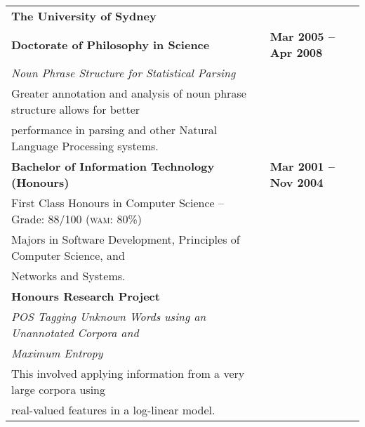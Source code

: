 \documentclass[]{article}
\begin{document}
\setlength{\tabcolsep}{0.1cm}
\begin{table*}[h!]
\begin{tabular}[h!]{p{12.7cm}l}

\textbf{The University of Sydney} & \\
\textbf{Doctorate of Philosophy in Science} & \textbf{Mar 2005 -- Apr 2008}\\
\hspace{0.5cm}\textit{Noun Phrase Structure for Statistical Parsing} & \\
\hspace{0.5cm}Greater annotation and analysis of noun phrase structure allows for better & \\
\hspace{0.5cm}performance in parsing and other Natural Language Processing systems. & \\

\textbf{Bachelor of Information Technology (Honours)} & \textbf{Mar 2001 -- Nov 2004}\\
\hspace{0.5cm}First Class Honours in Computer Science -- Grade: 88/100 (\textsc{wam}: 80\%) & \\
\hspace{0.5cm}Majors in Software Development, Principles of Computer Science, and & \\
\hspace{0.5cm}Networks and Systems. & \\

\textbf{Honours Research Project} & \\
\hspace{0.5cm}\textit{POS Tagging Unknown Words using an Unannotated Corpora and} & \\
\hspace{0.5cm}\textit{Maximum Entropy} & \\
\hspace{0.5cm}This involved applying information from a very large corpora using & \\
\hspace{0.5cm}real-valued features in a log-linear model. & \\

\end{tabular}
\end{table*}
\end{document}
